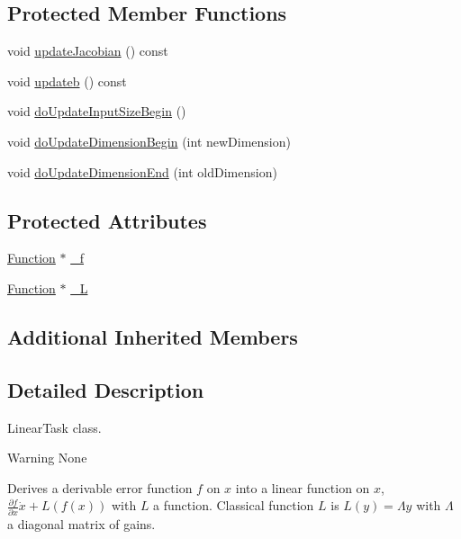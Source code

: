 \subsection*{Protected Member Functions}
\begin{DoxyCompactItemize}
\item 
void \hyperlink{classocra_1_1LinearTask_a1871041c2806b17f460a84d97d40817c}{update\+Jacobian} () const 
\item 
void \hyperlink{classocra_1_1LinearTask_ad9f2ca037dc4baa67a14a50752d46834}{updateb} () const 
\item 
void \hyperlink{classocra_1_1LinearTask_a9db869913d96b6917b2d40211761c019}{do\+Update\+Input\+Size\+Begin} ()
\item 
void \hyperlink{classocra_1_1LinearTask_a31c1140426b2f327e6a126fd917b04cd}{do\+Update\+Dimension\+Begin} (int new\+Dimension)
\item 
void \hyperlink{classocra_1_1LinearTask_aab97e5a858909e724ae8426f141c319b}{do\+Update\+Dimension\+End} (int old\+Dimension)
\end{DoxyCompactItemize}
\subsection*{Protected Attributes}
\begin{DoxyCompactItemize}
\item 
\hyperlink{classocra_1_1Function}{Function} $\ast$ \hyperlink{classocra_1_1LinearTask_ab79a5c0caf93e7ecbc214ad40a8d2701}{\+\_\+f}
\item 
\hyperlink{classocra_1_1Function}{Function} $\ast$ \hyperlink{classocra_1_1LinearTask_a9ce434a1d6641d486c20476b8f8a366d}{\+\_\+L}
\end{DoxyCompactItemize}
\subsection*{Additional Inherited Members}


\subsection{Detailed Description}
Linear\+Task class. 

\begin{DoxyWarning}{Warning}
None
\end{DoxyWarning}
Derives a derivable error function $ f $ on $ x $ into a linear function on $ x $, $ \frac{\partial f}{\partial x} \dot{x} + L(f(x)) $ with $ L $ a function. Classical function $ L $ is $ L(y) = \Lambda y $ with $ \Lambda $ a diagonal matrix of gains. 

